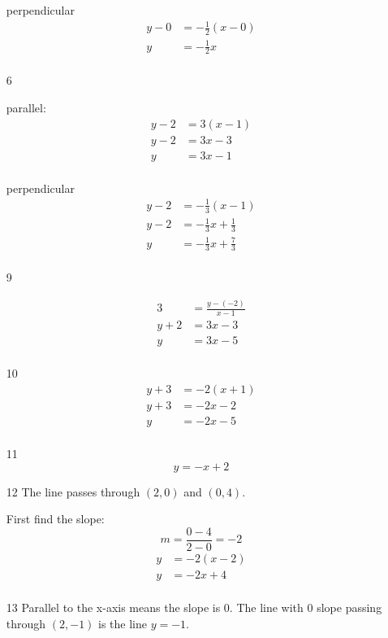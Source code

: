 \documentclass[fleqn,addpoints]{exam}
\begin{document}
\begin{itemize}
perpendicular
\begin{align*}
  y-0 &= -\frac{1}{2}(x-0) \\
  y   &= -\frac{1}{2}x \\
\end{align*}

\item[6]

parallel:
\begin{align*}
  y-2 &= 3(x-1) \\
  y-2 &= 3x-3 \\
  y &= 3x-1 \\
\end{align*}

perpendicular
\begin{align*}
  y-2 &= -\frac{1}{3} (x-1) \\
  y-2 &= -\frac{1}{3} x + \frac{1}{3} \\
  y &= -\frac{1}{3} x + \frac{7}{3} \\
\end{align*}

\item[9]

\begin{align*}
  3 &= \frac{y - (-2)}{x-1} \\
  y + 2 &= 3x - 3 \\
  y &= 3x - 5 \\
\end{align*}

\item[10]
\begin{align*}
  y + 3 &= -2(x + 1) \\
  y + 3 &= -2x - 2 \\
  y  &= -2x - 5 \\
\end{align*}

\item[11]
\[
  y = -x + 2
\]

\item[12]
The line passes through $(2, 0)$ and $(0, 4)$.

First find the slope:
\[
  m = \frac{0-4}{2-0} = -2
\]
\begin{align*}
y &= -2(x-2) \\
y &= -2x+4 \\
\end{align*}

\item[13]
Parallel to the x-axis means the slope is 0.  The line with 0 slope passing through $(2, -1)$ is the line $y=-1$.


\end{itemize}
\end{document}

